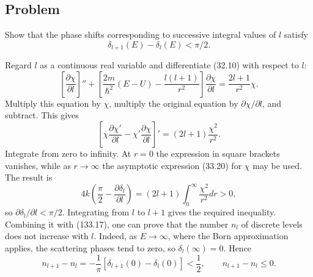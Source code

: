\subsection*{Problem}

\ProblemHeading Show that the phase shifts corresponding to successive
integral values of $l$ satisfy
\[
 \delta_{l+1}(E)-\delta_l(E)<\pi/2.
\]

\SolutionHeading Regard $l$ as a continuous real variable and differentiate
(32.10) with respect to $l$:
\[
 \left[\frac{\partial\chi}{\partial l}\right]''
 +\left[\frac{2m}{\hbar^2}(E-U)-\frac{l(l+1)}{r^2}\right]
 \frac{\partial\chi}{\partial l}=\frac{2l+1}{r^2}\chi.
\]
Multiply this equation by $\chi$, multiply the original equation by
$\partial\chi/\partial l$, and subtract. This gives
\[
 \left[\chi\frac{\partial\chi'}{\partial l}
 -\chi'\frac{\partial\chi}{\partial l}\right]'
 =(2l+1)\frac{\chi^2}{r^2}.
\]
Integrate from zero to infinity. At $r=0$ the expression in square brackets
vanishes, while as $r\to\infty$ the asymptotic expression (33.20) for $\chi$
may be used. The result is
\[
 4k\left(\frac\pi2-\frac{\partial\delta_l}{\partial l}\right)
 =(2l+1)\int_0^\infty\frac{\chi^2}{r^2}dr>0,
\]
so $\partial\delta_l/\partial l<\pi/2$. Integrating from $l$ to $l+1$ gives
the required inequality. Combining it with (133.17), one can prove that the
number $n_l$ of discrete levels does not increase with $l$. Indeed, as
$E\to\infty$, where the Born approximation applies, the scattering phases
tend to zero, so $\delta_l(\infty)=0$. Hence
\[
 n_{l+1}-n_l=-\frac1\pi[\delta_{l+1}(0)-\delta_l(0)]<\frac12,
 \qquad n_{l+1}-n_l\le0.
\]
